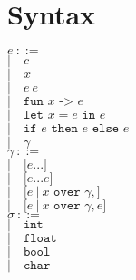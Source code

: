 ﻿\documentclass[5pt]{article}
\begin{document}
\section{Syntax}
\begin{multicols}{2}
\noindent $e \ ::= $ \\
\hspace*{10mm} $| \quad c$ \\
\hspace*{10mm} $| \quad x$ \\
\hspace*{10mm} $| \quad e \ e$ \\
\hspace*{10mm} $| \quad \texttt{fun } x \texttt{ -> } e$ \\
\hspace*{10mm} $| \quad \texttt{let }x = e \texttt{ in } e$ \\
\hspace*{10mm} $| \quad \texttt{if } e \texttt{ then } e \texttt{ else } e$ \\
\hspace*{10mm} $| \quad \gamma$ \\

\noindent $\gamma \ ::= $ \\
\hspace*{10mm} $| \quad \texttt{[}e...\texttt{]}$ \\
\hspace*{10mm} $| \quad \texttt{[}e...e\texttt{]}$ \\
\hspace*{10mm} $| \quad \texttt{[}e \ | \ x \texttt{ over } \gamma, \texttt{]}$ \\
\hspace*{10mm} $| \quad \texttt{[}e \ | \ x \texttt{ over } \gamma, e \texttt{]}$ \\

\noindent $\sigma \ ::= $ \\
\hspace*{10mm} $| \quad \texttt{int}$ \\
\hspace*{10mm} $| \quad \texttt{float}$ \\
\hspace*{10mm} $| \quad \texttt{bool}$ \\
\hspace*{10mm} $| \quad \texttt{char}$ \\


\end{multicols}
\end{document}
